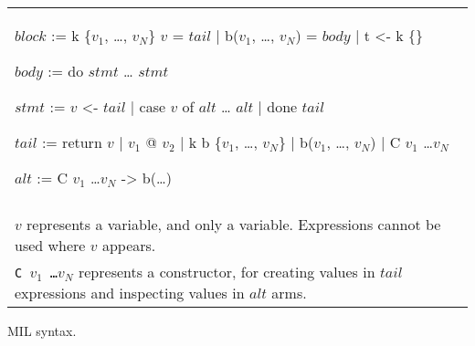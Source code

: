 \begin{myfig}[th]
\begin{tabular}{p{5in}}
\begin{center}
\begin{minipage}{4in}
\begin{AVerb}[numbers=left]
  $block$ := k \{$v_1$, \dots, $v_N$\} $v$ = $tail$ \label{fig_mil3_k1} 
    | b($v_1$, \dots, $v_N$) = $body$ \label{fig_mil3_b} 
    | t <- k \{\} \label{fig_mil3_t}  \label{fig_mil3_t} 

  $body$ := do \label{fig_mil3_body}
    $stmt$ 
    \dots 
    $stmt$

  $stmt$ := $v$ <- $tail$ \label{fig_mil3_stmt}  \label{fig_mil3_bind}
    | case $v$ of \label{fig_mil3_case}
        $alt$
        \dots
        $alt$
    | done $tail$ \label{fig_mil3_done}

  $tail$ := return $v$ \label{fig_mil3_return}
    | $v_1$ @ $v_2$ \label{fig_mil3_enter}
    | k b \{$v_1$, \dots, $v_N$\} \label{fig_mil3_capture}
    | b($v_1$, \dots, $v_N$) \label{fig_mil3_goto}
    | C $v_1$ \dots $v_N$ \label{fig_mil3_const}

  $alt$ := C $v_1$ \dots $v_N$ -> b(\dots) 
\end{AVerb}
\end{minipage}
\end{center} \\ \\
  $v$ represents a variable, and only a variable. Expressions
  cannot be used where $v$ appears. \\ 

  \texttt{C $v_1$ \dots $v_N$} represents a constructor, for creating
  values in $tail$ expressions and inspecting values in $alt$ arms. \\
\end{tabular}
\caption{MIL syntax.}
\label{fig_mil3}
\end{myfig}
